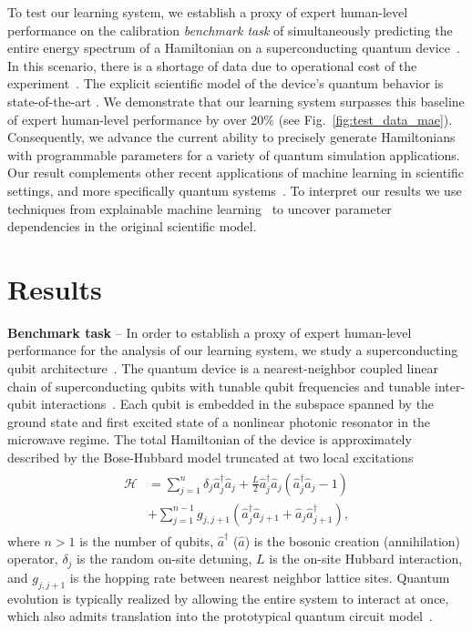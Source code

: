 \documentclass[aps,twocolumn,superscriptaddress,floatfix,preprintnumbers,showkeys]{revtex4}
\begin{document}
To test our learning system, we establish a proxy of expert human-level performance on the calibration \textit{benchmark task} of simultaneously predicting the entire energy spectrum of a Hamiltonian on a superconducting quantum device~\cite{Chen_2014, Roushan_2017, Neill_2018, Chiaro_2019}. In this scenario, there is a shortage of data due to operational cost of the experiment~\cite{Roushan_2017}. The explicit scientific model of the device's quantum behavior is state-of-the-art \cite{Roushan_2017, Neill_2018, Chiaro_2019}. We demonstrate that our learning system surpasses this baseline of expert human-level performance by over $20\%$ (see Fig.~\ref{fig:test_data_mae}). Consequently, we advance the current ability to precisely generate Hamiltonians with programmable parameters for a variety of quantum simulation applications. Our result complements other recent applications of machine learning in scientific settings, and more specifically quantum systems~\cite{Schmidt_2009, Zahedinejad_2016, Brunton_2016, Lin_2017, Biamonte_2017, Carrasquilla_2017, Koch-Janusz_2018, Torlai_2018, Butler_2018, Melnikov_2018, Dunjko_2018, Wu_2019, Giuseppe_2019, Mehta_2019, Iten_2020, Wetzel_2020, Udrescu_2020}. To interpret our results we use techniques from explainable machine learning~\cite{Lundberg_2017, Molnar_2020} to uncover parameter dependencies in the original scientific model.

\section*{Results}

\textbf{Benchmark task} -- In order to establish a proxy of expert human-level performance for the analysis of our learning system, we study a superconducting qubit architecture~\cite{Chen_2014}. The quantum device is a nearest-neighbor coupled linear chain of superconducting qubits with tunable qubit frequencies and tunable inter-qubit interactions~\cite{Chen_2014, Roushan_2017, Neill_2018, Chiaro_2019}. Each qubit is embedded in the subspace spanned by the ground state and first excited state of a nonlinear photonic resonator in the microwave regime. The total Hamiltonian of the device is approximately described by the Bose-Hubbard model truncated at two local excitations
\begin{align}
\begin{split}
\mathcal{H} & = \sum_{j=1}^{n} \delta_{j} \hat{a}^{\dagger}_{j} \hat{a}_{j} + \frac{L}{2} \hat{a}^{\dagger}_{j} \hat{a}_{j} (\hat{a}^{\dagger}_{j} \hat{a}_{j} - 1) \\
& + \sum_{j=1}^{n-1} g_{j, j+1} (\hat{a}^{\dagger}_{j} \hat{a}_{j+1} + \hat{a}_{j} \hat{a}^{\dagger}_{j+1}),
\end{split}
\label{eq:bose_hubbard}
\end{align} where $n > 1$ is the number of qubits, $\hat{a}^{\dagger}$ ($\hat{a}$) is the bosonic creation (annihilation) operator, $\delta_{j}$ is the random on-site detuning, $L$ is the on-site Hubbard interaction, and $g_{j, j+1}$ is the hopping rate between nearest neighbor lattice sites. Quantum evolution is typically realized by allowing the entire system to interact at once, which also admits translation into the prototypical quantum circuit model~\cite{Neill_2018}. 
\end{document}

